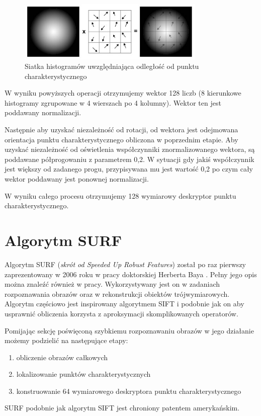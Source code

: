 \begin{figure}[!htb]
\centering
\includegraphics[width=0.8\textwidth]{pict/02/sift/sift_ais_des.jpg}
\caption{Siatka histogramów uwzględniająca odległość od punktu charakterystycznego}
\label{fig:sift_ais_des}
\end{figure}

W wyniku powyższych operacji otrzymujemy wektor 128 liczb (8 kierunkowe histogramy zgrupowane w 4 wierszach po 4 kolumny). Wektor ten jest poddawany normalizacji. 

Następnie aby uzyskać niezależność od rotacji, od wektora jest odejmowana orientacja punktu charakterystycznego obliczona w poprzednim etapie. Aby uzyskać niezależność od oświetlenia współczynniki znormalizowanego wektora, są poddawane półprogowaniu z parametrem 0,2. W sytuacji gdy jakiś współczynnik jest większy od zadanego progu, przypisywana mu jest wartość 0,2 po czym cały wektor poddawany jest ponownej normalizacji.

W wyniku całego procesu otrzymujemy 128 wymiarowy deskryptor punktu charakterystycznego.



\FloatBarrier
\newpage
\section{Algorytm SURF}
Algorytm SURF (\textit{skrót od Speeded Up Robust Features}) został po raz pierwszy zaprezentowany w 2006 roku w pracy doktorskiej Herberta Baya \cite{HB06}. Pełny jego opis można znaleźć również w pracy\cite{HB08}. Wykorzystywany jest on w zadaniach rozpoznawania obrazów oraz w rekonstrukcji obiektów trójwymiarowych. Algorytm częściowo jest inspirowany algorytmem SIFT i podobnie jak on aby usprawnić obliczenia korzysta z aproksymacji skomplikowanych operatorów. 

Pomijając sekcję poświęconą szybkiemu rozpoznawaniu obrazów w jego działanie możemy podzielić na następujące etapy:
\begin{enumerate}
\item{obliczenie obrazów całkowych}
\item{lokalizowanie punktów charakterystycznych}
\item{konstruowanie 64 wymiarowego deskryptora punktu charakterystycznego}
\end{enumerate}
SURF podobnie jak algorytm SIFT jest chroniony patentem amerykańskim.
